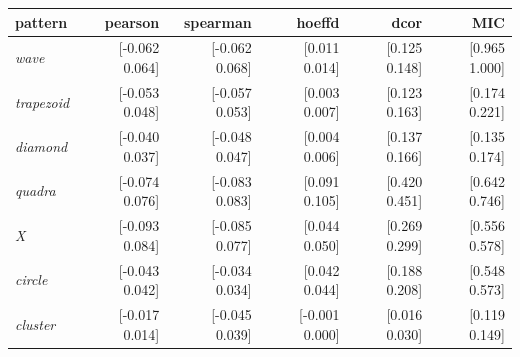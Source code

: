 \documentclass[english,nohyper,titlepage]{tufte-handout}\usepackage{graphicx, color}
\begin{document}
{\begin{tabular}{lrrrrr}
pattern & pearson & spearman & hoeffd & dcor & MIC  \\ 
\hline  \relax 
\emph{wave}   & [-0.062 0.064] & [-0.062 0.068] & [0.011 0.014] & [0.125 0.148] & [0.965 1.000]  \\ \relax 
\emph{trapezoid}  & [-0.053 0.048] & [-0.057 0.053] & [0.003 0.007] & [0.123 0.163] & [0.174 0.221]  \\ \relax
\emph{diamond}  & [-0.040 0.037] & [-0.048 0.047] & [0.004 0.006] & [0.137 0.166] & [0.135 0.174]  \\ \relax
\emph{quadra} & [-0.074 0.076] & [-0.083 0.083] & [0.091 0.105] & [0.420 0.451] & [0.642 0.746]  \\ \relax
\emph{X}      & [-0.093 0.084] & [-0.085 0.077] & [0.044 0.050] & [0.269 0.299] & [0.556 0.578]  \\ \relax
\emph{circle} & [-0.043 0.042] & [-0.034 0.034] & [0.042 0.044] & [0.188 0.208] & [0.548 0.573]  \\ \relax
\emph{cluster} & [-0.017 0.014] & [-0.045 0.039] & [-0.001 0.000] & [0.016 0.030] & [0.119 0.149]\\
\hline
\end{tabular}
}



\pagebreak
\end{document}
